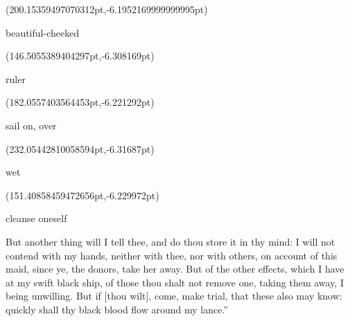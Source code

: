 \documentclass{ransom}
\begin{document}
\begin{foreignpage}
{\begin{textblock*}{66.25943pt}(200.15359497070312pt,\pdfpageheight-206.37759399414062pt-6.1952169999999995pt)\parbox[b]{66.25943pt}{\begin{blacktext}\begin{latin}beautiful-cheeked\end{latin}\end{blacktext}}\end{textblock*}
\begin{textblock*}{30.23753pt}(146.5055389404297pt,\pdfpageheight-179.37759399414062pt-6.308169pt)\parbox[b]{30.23753pt}{\begin{blacktext}\begin{latin}ruler\end{latin}\end{blacktext}}\end{textblock*}
\begin{textblock*}{46.33691pt}(182.0557403564453pt,\pdfpageheight-152.37759399414062pt-6.221292pt)\parbox[b]{46.33691pt}{\begin{blacktext}\begin{latin}sail on, over\end{latin}\end{blacktext}}\end{textblock*}
\begin{textblock*}{24.52765pt}(232.05442810058594pt,\pdfpageheight-152.37759399414062pt-6.31687pt)\parbox[b]{24.52765pt}{\begin{blacktext}\begin{latin}wet\end{latin}\end{blacktext}}\end{textblock*}
\begin{textblock*}{80.57137pt}(151.40858459472656pt,\pdfpageheight-125.37759399414062pt-6.229972pt)\parbox[b]{80.57137pt}{\begin{blacktext}\begin{latin}cleanse oneself\end{latin}\end{blacktext}}\end{textblock*}
 }
\end{foreignpage}


But another thing will I tell thee, and do thou store it in thy mind: I
will not contend with my hands, neither with thee, nor with others, on
account of this maid, since ye, the donors, take her away. But of the
other effects, which I have at my swift black ship, of those thou shalt
not remove one, taking them away, I being unwilling. But if [thou
wilt], come, make trial, that these also may know: quickly shall thy
black blood flow around my lance.”
\end{document}
